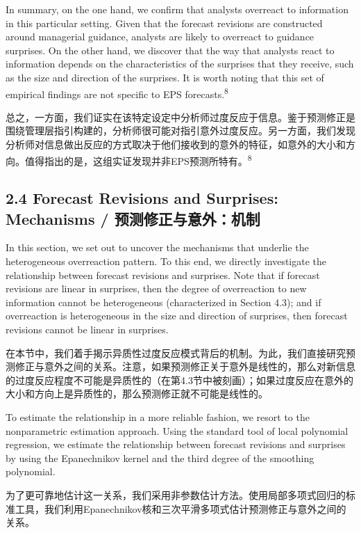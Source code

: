 \documentclass[12pt,a4paper]{article}
\newenvironment{original}
  {\par\medskip\noindent\ignorespaces}
  {\par\medskip}
\newenvironment{translation}
  {\par\noindent{\color{transblue}\ignorespaces}}
  {\par\bigskip}
\begin{document}
\begin{original}
In summary, on the one hand, we confirm that analysts overreact to information in this particular setting. Given that the forecast revisions are constructed around managerial guidance, analysts are likely to overreact to guidance surprises. On the other hand, we discover that the way that analysts react to information depends on the characteristics of the surprises that they receive, such as the size and direction of the surprises. It is worth noting that this set of empirical findings are not specific to EPS forecasts.\textsuperscript{8}
\end{original}
\begin{translation}
总之，一方面，我们证实在该特定设定中分析师过度反应于信息。鉴于预测修正是围绕管理层指引构建的，分析师很可能对指引意外过度反应。另一方面，我们发现分析师对信息做出反应的方式取决于他们接收到的意外的特征，如意外的大小和方向。值得指出的是，这组实证发现并非EPS预测所特有。\textsuperscript{8}
\end{translation}

\subsection{2.4 Forecast Revisions and Surprises: Mechanisms / 预测修正与意外：机制}

\begin{original}
In this section, we set out to uncover the mechanisms that underlie the heterogeneous overreaction pattern. To this end, we directly investigate the relationship between forecast revisions and surprises. Note that if forecast revisions are linear in surprises, then the degree of overreaction to new information cannot be heterogeneous (characterized in Section 4.3); and if overreaction is heterogeneous in the size and direction of surprises, then forecast revisions cannot be linear in surprises.
\end{original}
\begin{translation}
在本节中，我们着手揭示异质性过度反应模式背后的机制。为此，我们直接研究预测修正与意外之间的关系。注意，如果预测修正关于意外是线性的，那么对新信息的过度反应程度不可能是异质性的（在第4.3节中被刻画）；如果过度反应在意外的大小和方向上是异质性的，那么预测修正就不可能是线性的。
\end{translation}

\begin{original}
To estimate the relationship in a more reliable fashion, we resort to the nonparametric estimation approach. Using the standard tool of local polynomial regression, we estimate the relationship between forecast revisions and surprises by using the Epanechnikov kernel and the third degree of the smoothing polynomial.
\end{original}
\begin{translation}
为了更可靠地估计这一关系，我们采用非参数估计方法。使用局部多项式回归的标准工具，我们利用Epanechnikov核和三次平滑多项式估计预测修正与意外之间的关系。
\end{translation}
\end{document}
